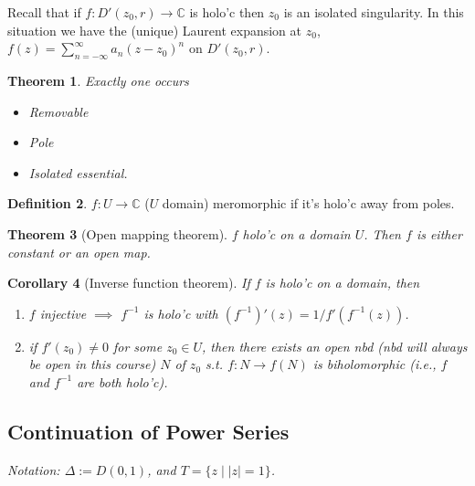 \documentclass{article}
\theoremstyle{definition}
\newtheorem{defn}{Definition}[section]
\theoremstyle{remark}
\theoremstyle{plain}
\newtheorem{thm}[defn]{Theorem}
\newtheorem{crly}[defn]{Corollary}
\newcommand{\CC}{\mathbb{C}}
\begin{document}
Recall that if $f:D'(z_0,r)\to\CC$ is holo'c then $z_0$ is an isolated singularity.
In this situation we have the (unique) Laurent expansion at $z_0$, $f(z)=\sum_{n=-\infty}^\infty a_n(z-z_0)^n$ on $D'(z_0,r)$.
\begin{thm}
    Exactly one occurs
    \begin{itemize}
        \item Removable
        \item Pole
        \item Isolated essential.
    \end{itemize}
\end{thm}
\begin{defn}
    $f:U\to\CC$ ($U$ domain) meromorphic if it's holo'c away from poles.
\end{defn}
\begin{thm}[Open mapping theorem]
    $f$ holo'c on a domain $U$. Then $f$ is either constant or an open map.
\end{thm}
\begin{crly}[Inverse function theorem]
    If $f$ is holo'c on a domain, then
    \begin{enumerate}
        \item $f$ injective $\implies$ $f^{-1}$ is holo'c with $(f^{-1})'(z)=1/f'(f^{-1}(z))$.
        \item if $f'(z_0)\neq 0$ for some $z_0\in U$, then there exists an open nbd (nbd will always be open in this course) $N$ of $z_0$ s.t. $f:N\to f(N)$ is biholomorphic (i.e., $f$ and $f^{-1}$ are both holo'c).
    \end{enumerate}
\end{crly}

\subsection{Continuation of Power Series}
\textit{Notation: $\Delta:=D(0,1)$, and $T=\{z\mid |z|=1\}$.}
\end{document}
